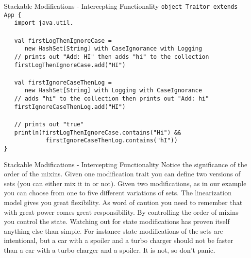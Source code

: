 \begin{frame}[fragile]{Stackable Modifications - Intercepting Functionality}
\lstinline!object Traitor extends App {!\\
\lstinline!   import java.util._!\\
\lstinline!!\\
\lstinline!   val firstLogThenIgnoreCase =!\\
\lstinline!      new HashSet[String] with CaseIgnorance with Logging!\\
\lstinline!   // prints out "Add: HI" then adds "hi" to the collection!\\
\lstinline!   firstLogThenIgnoreCase.add("HI")!\\
\lstinline!!\\
\lstinline!   val firstIgnoreCaseThenLog =!\\
\lstinline!      new HashSet[String] with Logging with CaseIgnorance!\\
\lstinline!   // adds "hi" to the collection then prints out "Add: hi"!\\
\lstinline!   firstIgnoreCaseThenLog.add("HI")!\\
\lstinline!!\\
\lstinline!   // prints out "true"!\\
\lstinline!   println(firstLogThenIgnoreCase.contains("Hi") &&!\\
\lstinline!            firstIgnoreCaseThenLog.contains("hI"))!\\
\lstinline!}!
\end{frame}

\begin{frame}{Stackable Modifications - Intercepting Functionality}
Notice the significance of the order of the mixins. Given one modification trait you can
define two versions of sets (you can either mix it in or not). Given two modifications,
as in our example you can choose from one to five different variations of sets. The
linearization model gives you great flexibility.
\newline
\newline
As word of caution you need to remember that with great power comes great responsibility.
By controlling the order of mixins you control the state. Watching out for state
modifications has proven itself anything else than simple. For instance state
modifications of the sets are intentional, but a car with a spoiler and a turbo charger should not
be faster than a car with a turbo charger and a spoiler. It is not, so don't
panic.
\end{frame}

